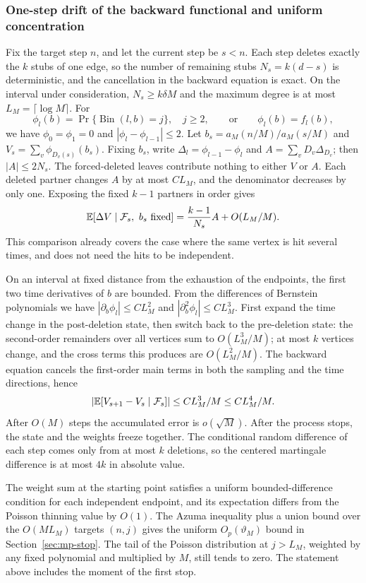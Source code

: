 \subsubsection{One-step drift of the backward functional and uniform concentration}
Fix the target step $n$, and let the current step be $s<n$. Each step deletes exactly the $k$ stubs of one
edge, so the number of remaining stubs $N_s=k(d-s)$ is deterministic, and the cancellation in the backward
equation is exact. On the interval under consideration, $N_s\ge k\delta M$ and the maximum degree is at most
$L_M=\lceil\log M\rceil$. For
\[
\phi_l(b)=\Pr\{\operatorname{Bin}(l,b)=j\},\quad j\ge2,
\qquad\text{or}\qquad \phi_l(b)=f_l(b),
\]
we have $\phi_0=\phi_1=0$ and $|\phi_l-\phi_{l-1}|\le2$. Let $b_s=a_M(n/M)/a_M(s/M)$ and
$V_s=\sum_v\phi_{D_v(s)}(b_s)$. Fixing $b_s$, write $\Delta_l=\phi_{l-1}-\phi_l$ and
$A=\sum_vD_v\Delta_{D_v}$; then $|A|\le2N_s$. The forced-deleted leaves contribute nothing to either $V$ or
$A$. Each deleted partner changes $A$ by at most $CL_M$, and the denominator decreases by only one. Exposing
the fixed $k-1$ partners in order gives
\[
\mathbb E[\Delta V\mid\mathcal F_s,\ b_s\text{ fixed}]
=\frac{k-1}{N_s}A+O(L_M/M).
\]
This comparison already covers the case where the same vertex is hit several times, and does not need the
hits to be independent.

On an interval at fixed distance from the exhaustion of the endpoints, the first two time derivatives of $b$
are bounded. From the differences of Bernstein polynomials we have $|\partial_b\phi_l|\le CL_M^2$ and
$|\partial_b^2\phi_l|\le CL_M^3$. First expand the time change in the post-deletion state, then switch back
to the pre-deletion state: the second-order remainders over all vertices sum to $O(L_M^3/M)$; at most $k$
vertices change, and the cross terms this produces are $O(L_M^2/M)$. The backward equation cancels the
first-order main terms in both the sampling and the time directions, hence
\[
|\mathbb E[V_{s+1}-V_s\mid\mathcal F_s]|\le CL_M^3/M
\le CL_M^4/M.
\]
After $O(M)$ steps the accumulated error is $o(\sqrt M)$. After the process stops, the state and the weights
freeze together. The conditional random difference of each step comes only from at most $k$ deletions, so the
centered martingale difference is at most $4k$ in absolute value.

The weight sum at the starting point satisfies a uniform bounded-difference condition for each independent
endpoint, and its expectation differs from the Poisson thinning value by $O(1)$. The Azuma inequality plus a
union bound over the $O(ML_M)$ targets $(n,j)$ gives the uniform $O_p(\vartheta_M)$ bound in
Section~\ref{sec:mp-stop}. The tail of the Poisson distribution at $j>L_M$, weighted by any fixed polynomial
and multiplied by $M$, still tends to zero. The statement above includes the moment of the first stop.

